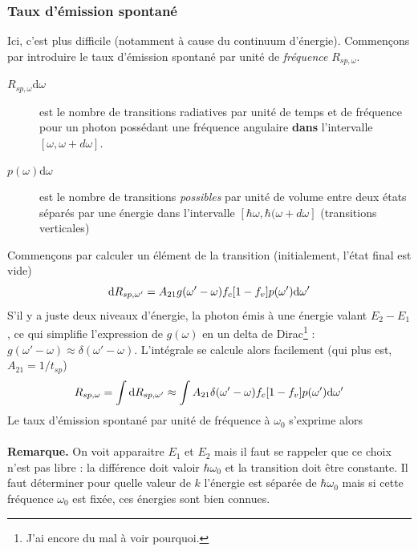 		\subsubsection{Taux d'émission spontané}
		Ici, c'est plus difficile (notamment à cause du continuum d'énergie). Commençons par 
		introduire le taux d'émission spontané par unité de \textit{fréquence} $R_{sp,\omega}$.
		\begin{description}
		\item[$R_{sp,\omega}$d$\omega$] est le nombre de transitions radiatives par unité de 
		temps et de fréquence pour un photon possédant une fréquence angulaire \textbf{dans} 
		l'intervalle $[\omega,\omega+d\omega]$.
		\item[$p(\omega)$d$\omega$] est le nombre de transitions \textit{possibles} par unité de
		volume entre deux états séparés par une énergie dans l'intervalle $[\hbar\omega,\hbar(\omega
		+d\omega]$ (transitions verticales)
		\end{description}
		Commençons par calculer un élément de la transition (initialement, l'état final est vide)
		\begin{equation}
		{\rm{d}}{R_{sp,\omega '}} = {A_{21}}g(\omega ' - \omega ){f_c}[1 - {f_v}]p(\omega '){\rm{d}}
		\omega '
		\end{equation}
		S'il y a juste deux niveaux d'énergie, la photon émis à une énergie valant $E_2-E_1$, ce qui
		simplifie l'expression de $g(\omega)$ en un delta de Dirac\footnote{J'ai encore du mal à voir
		pourquoi.} : $g(\omega'-\omega) \approx \delta(\omega'-\omega)$. L'intégrale se calcule
		alors facilement (qui plus est, $A_{21} = 1/t_{sp}$)
		\begin{equation}
		{R_{sp,\omega }} = \int {{\rm{d}}{R_{sp,\omega '}}}  \approx \int {{A_{21}}\delta (\omega ' -
		\omega ){f_c}[1 - {f_v}]p(\omega '){\rm{d}}\omega '} 
		\end{equation}
		Le taux d'émission spontané par unité de fréquence à $\omega_0$ s'exprime alors\\
		
		\ \\
		
		\textbf{Remarque.} On voit apparaitre $E_1$ et $E_2$ mais il faut se rappeler que ce choix
		n'est pas libre : la différence doit valoir $\hbar\omega_0$ et la transition doit être 
		constante. Il faut déterminer pour quelle valeur de $k$ l'énergie est séparée de $\hbar
		\omega_0$ mais si cette fréquence $\omega_0$ est fixée, ces énergies sont bien connues.
		
